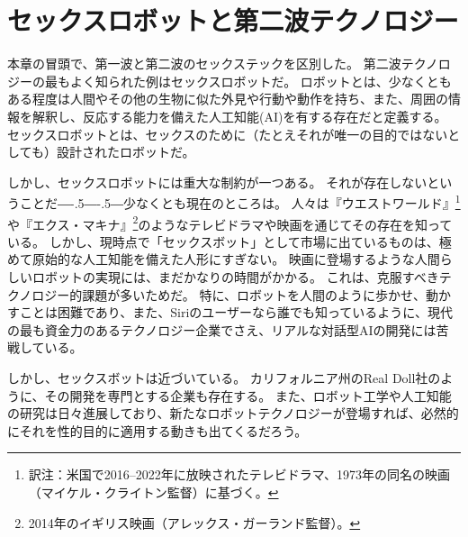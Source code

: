 \documentclass[paper=a4,book,openany]{jlreq}
\def\DDASH{―\kern-.5\zw―\kern-.5\zw―} %
\begin{document}
\section{セックスロボットと第二波テクノロジー}

本章の冒頭で、第一波と第二波のセックステックを区別した。
第二波テクノロジーの最もよく知られた例はセックスロボットだ。
ロボットとは、少なくともある程度は人間やその他の生物に似た外見や行動や動作を持ち、また、周囲の情報を解釈し、反応する能力を備えた人工知能(AI)を有する存在だと定義する\citep{danaher17:_shoul_we_be_think_sex_robot}。
セックスロボットとは、セックスのために（たとえそれが唯一の目的ではないとしても）設計されたロボットだ。

しかし、セックスロボットには重大な制約が一つある。
それが存在しないということだ{\DDASH}少なくとも現在のところは。
人々は『ウエストワールド』\footnote{訳注：米国で2016--2022年に放映されたテレビドラマ、1973年の同名の映画（マイケル・クライトン監督）に基づく。}や『エクス・マキナ』\footnote{2014年のイギリス映画（アレックス・ガーランド監督）。}のようなテレビドラマや映画を通じてその存在を知っている。
しかし、現時点で「セックスボット」として市場に出ているものは、極めて原始的な人工知能を備えた人形にすぎない。
映画に登場するような人間らしいロボットの実現には、まだかなりの時間がかかる。
これは、克服すべきテクノロジー的課題が多いためだ。
特に、ロボットを人間のように歩かせ、動かすことは困難であり、また、Siriのユーザーなら誰でも知っているように、現代の最も資金力のあるテクノロジー企業でさえ、リアルな対話型AIの開発には苦戦している。

しかし、セックスボットは近づいている。
カリフォルニア州のReal Doll社のように、その開発を専門とする企業も存在する。
また、ロボット工学や人工知能の研究は日々進展しており、新たなロボットテクノロジーが登場すれば、必然的にそれを性的目的に適用する動きも出てくるだろう。
\end{document}
